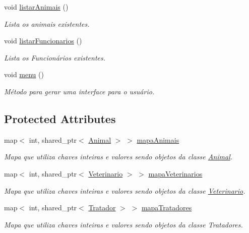 \begin{DoxyCompactItemize}
void \hyperlink{classPetFera_ada53a8bfa85383a83f0841857f817326}{listar\+Animais} ()
\begin{DoxyCompactList}\small\item\em Lista os animais existentes. \end{DoxyCompactList}\item 
void \hyperlink{classPetFera_af700a6ba89353b2f91ef3224ef0b6e22}{listar\+Funcionarios} ()
\begin{DoxyCompactList}\small\item\em Lista os Funcionários existentes. \end{DoxyCompactList}\item 
void \hyperlink{classPetFera_afe29caf9e249d3713ea8f915e8b13d38}{menu} ()
\begin{DoxyCompactList}\small\item\em Método para gerar uma interface para o usuário. \end{DoxyCompactList}\end{DoxyCompactItemize}
\subsection*{Protected Attributes}
\begin{DoxyCompactItemize}
\item 
map$<$ int, shared\+\_\+ptr$<$ \hyperlink{classAnimal}{Animal} $>$ $>$ \hyperlink{classPetFera_ab0ba5fe6332bcffdabb7b03001280697}{mapa\+Animais}
\begin{DoxyCompactList}\small\item\em Mapa que utiliza chaves inteiras e valores sendo objetos da classe \hyperlink{classAnimal}{Animal}. \end{DoxyCompactList}\item 
map$<$ int, shared\+\_\+ptr$<$ \hyperlink{classVeterinario}{Veterinario} $>$ $>$ \hyperlink{classPetFera_a2bed2112a627bbdb3c0338654330a1ab}{mapa\+Veterinarios}
\begin{DoxyCompactList}\small\item\em Mapa que utiliza chaves inteiras e valores sendo objetos da classe \hyperlink{classVeterinario}{Veterinario}. \end{DoxyCompactList}\item 
map$<$ int, shared\+\_\+ptr$<$ \hyperlink{classTratador}{Tratador} $>$ $>$ \hyperlink{classPetFera_ac85920fc6c1471743838e6fe4444304d}{mapa\+Tratadores}
\begin{DoxyCompactList}\small\item\em Mapa que utiliza chaves inteiras e valores sendo objetos da classe Tratadores. \end{DoxyCompactList}\end{DoxyCompactItemize}


